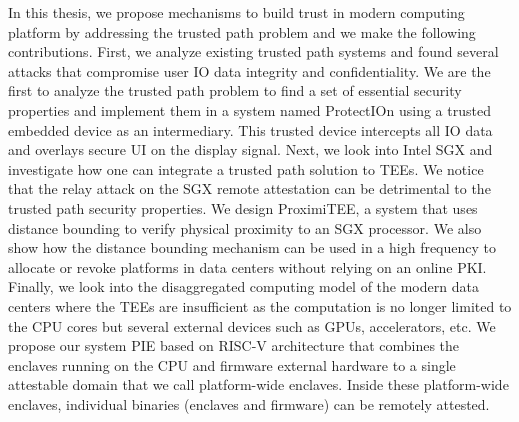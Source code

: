 In this thesis, we propose mechanisms to build trust in modern computing platform by addressing the trusted path problem and we make the following contributions. First, we analyze existing trusted path systems and found several attacks that compromise user IO data integrity and confidentiality. We are the first to analyze the trusted path problem to find a set of essential security properties and implement them in a system named ProtectIOn using a trusted embedded device as an intermediary. This trusted device intercepts all IO data and overlays secure UI on the display signal. Next, we look into Intel SGX and investigate how one can integrate a trusted path solution to TEEs. We notice that the relay attack on the SGX remote attestation can be detrimental to the trusted path security properties. We design ProximiTEE, a system that uses distance bounding to verify physical proximity to an SGX processor. We also show how the distance bounding mechanism can be used in a high frequency to allocate or revoke platforms in data centers without relying on an online PKI. Finally, we look into the disaggregated computing model of the modern data centers where the TEEs are insufficient as the computation is no longer limited to the CPU cores but several external devices such as GPUs, accelerators, etc. We propose our system PIE based on RISC-V architecture that combines the enclaves running on the CPU and firmware external hardware to a single attestable domain that we call platform-wide enclaves. Inside these platform-wide enclaves, individual binaries (enclaves and firmware) can be remotely attested.
  

\endgroup
